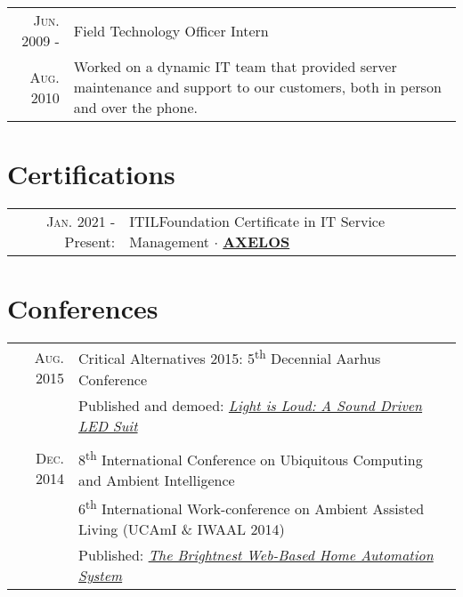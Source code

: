 \documentclass[letterpaper,10pt]{article}
\begin{document}
\begin{tabular}{R|p{6.2in}}
	\textsc{Jun.} 2009 -           & Field Technology Officer Intern                                                                 \\
	\textsc{Aug.} 2010\phantom{ -} & \footnotesize Worked on a dynamic IT team that provided server maintenance and support to our
	customers, both in person and over the phone.
\end{tabular}

\section{Certifications}
\begin{tabular}{rl}
	\textsc{Jan.} 2021 - Present: & \textsc{ITIL}\textsuperscript{\circledR}\phantom{ }Foundation Certificate in IT Service Management
	$\cdot$ \href{https://www.axelos.com/successful-candidates-register}{\textbf{AXELOS}}                                              \\
\end{tabular}

\section{Conferences}
\begin{tabular}{R|p{6.2in}}
	\textsc{Aug.} 2015 & Critical Alternatives 2015: 5\textsuperscript{th} Decennial Aarhus Conference                        \\
	                   & \small Published and demoed: \href{https://doi.org/10.7146/aahcc.v1i1.21320}
	{\emph{Light is Loud: A Sound Driven LED Suit}}                                                                           \\
	                                                                                                      \\

	\textsc{Dec.} 2014 & 8\textsuperscript{th} International Conference on Ubiquitous Computing and Ambient Intelligence      \\
	                   & 6\textsuperscript{th} International Work-conference on Ambient Assisted Living (UCAmI \& IWAAL 2014) \\
	                   & \small Published: \href{https://doi.org/10.1007/978-3-319-13102-3_14}
	{\emph{The Brightnest Web-Based Home Automation System}}                                                                  \\
\end{tabular}
\end{document}
